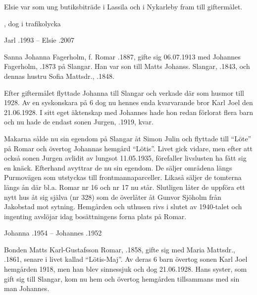 Elsie var som ung butiksbiträde i Lassila och i Nykarleby fram till giftermålet.
\begin{jhchildren}
  \item {}
  \item {}, dog i trafikolycka
\end{jhchildren}

Jarl .1993  --  Elsie .2007




Sanna Johanna Fagerholm, f. Romar .1887, gifte sig 06.07.1913 med Johannes Fagerholm, .1873 på Slangar. Han var son till Matts Johanss. Slangar, .1843, och dennas hustru Sofia Mattsdr., .1848.

Efter giftermålet flyttade Johanna till Slangar och verkade där som husmor till 1928. Av en syskonskara på 6 dog nu hennes enda kvarvarande bror Karl Joel den 21.06.1928. I sitt eget äktenskap med Johannes hade hon redan förlorat flera barn och nu hade de endast sonen Jurgen, .1919, kvar.


Makarna sålde nu sin egendom på Slangar åt Simon Julin och flyttade till ``Löte'' på Romar och övertog Johannas hemgård  ``Lötis''. Livet gick vidare, men efter att också sonen Jurgen avlidit av lungsot 11.05.1935, förefaller livslusten ha fått sig en knäck. Efterhand avyttrar de nu sin egendom. De säljer områdena  längs Purmovägen som utstyckas till frontmannaparceller. Likaså säljer de tomterna längs ån där bl.a.  Romar nr 16 och nr 17 nu står. Slutligen låter de uppföra ett nytt hus åt sig själva (nr 328) som de överlåter åt Gunvor Sjöholm från Jakobstad mot sytning. Hemgården och uthusen rivs i slutet av 1940-talet och ingenting avslöjar idag bosättningens forna plats på Romar.

Johanna .1954  --  Johannes .1952


Bonden Matts Karl-Gustafsson Romar, .1858, gifte sig med Maria Mattsdr., .1861, senare i livet kallad ``Lötis-Maj''. Av deras 6 barn övertog sonen Karl Joel hemgården 1918, men han blev sinnessjuk och dog 21.06.1928. Hans syster, som gift sig till Slangar, kom nu hem och övertog hemgården tillsammans med sin man Johannes.


